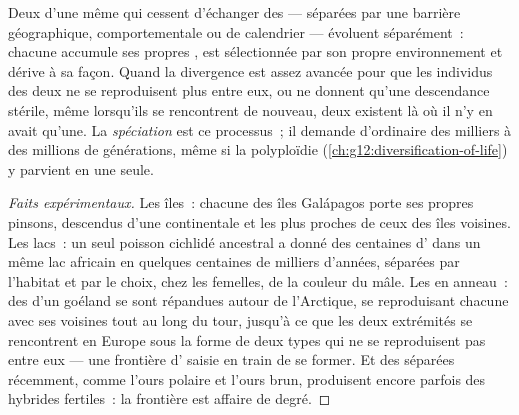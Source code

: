 \begin{proposition}[La spéciation]\label{prop:g12:selection-drift-speciation:speciation}
Deux  d'une même  qui cessent d'échanger des  ---
séparées par une barrière géographique, comportementale ou de
calendrier --- évoluent séparément~: chacune accumule ses propres
, est sélectionnée par son propre environnement et dérive à sa
façon. Quand la divergence est assez avancée pour que les individus des
deux  ne se reproduisent plus entre eux, ou ne donnent
qu'une descendance stérile, même lorsqu'ils se rencontrent de nouveau,
deux  existent là où il n'y en avait qu'une. La
\emph{spéciation} est ce processus~; il demande
d'ordinaire des milliers à des millions de générations, même si la
polyploïdie (\cref{ch:g12:diversification-of-life}) y parvient en une
seule.
\end{proposition}
\begin{proof}[Faits expérimentaux]
Les îles~: chacune des îles Galápagos porte ses propres pinsons,
descendus d'une  continentale et les plus proches de ceux des
îles voisines. Les lacs~: un seul poisson cichlidé ancestral a donné
des centaines d' dans un même lac africain en quelques centaines
de milliers d'années, séparées par l'habitat et par le choix, chez les
femelles, de la couleur du mâle. Les  en anneau~: des
 d'un goéland se sont répandues autour de l'Arctique, se
reproduisant chacune avec ses voisines tout au long du tour, jusqu'à ce
que les deux extrémités se rencontrent en Europe sous la forme de deux
types qui ne se reproduisent pas entre eux --- une frontière d'
saisie en train de se former. Et des  séparées récemment, comme
l'ours polaire et l'ours brun, produisent encore parfois des hybrides
fertiles~: la frontière est affaire de degré.
\end{proof}

